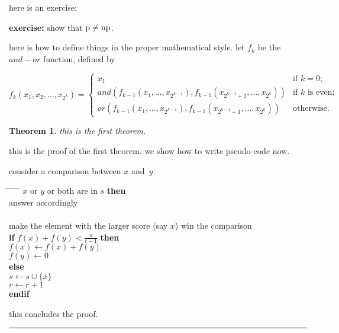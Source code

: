 \documentclass[twoside]{article}
\newcounter{lecnum}
\newtheorem{theorem}{Theorem}[lecnum]
\newenvironment{proof}{{\bf Proof:}}{\hfill\rule{2mm}{2mm}}
\begin{document}
 
here is an exercise:

{\bf exercise:}  show that ${\rm p}\ne{\rm np}$.

here is how to define things in the proper mathematical style.
let $f_k$ be the $and-or$ function, defined by

\[ f_k(x_1, x_2, \ldots, x_{2^k}) = \left\{ \begin{array}{ll}

	x_1 & \mbox{if $k = 0$;} \\

	and(f_{k-1}(x_1, \ldots, x_{2^{k-1}}),
	   f_{k-1}(x_{2^{k-1} + 1}, \ldots, x_{2^k}))
	 & \mbox{if $k$ is even;} \\

	or(f_{k-1}(x_1, \ldots, x_{2^{k-1}}),
	   f_{k-1}(x_{2^{k-1} + 1}, \ldots, x_{2^k}))	
	& \mbox{otherwise.} 
	\end{array}
	\right. \]

\begin{theorem}
this is the first theorem.
\end{theorem}

\begin{proof}
this is the proof of the first theorem. we show how to write pseudo-code now.

consider a comparison between $x$ and~$y$:
\begin{tabbing}
\hspace*{.25in} \= \hspace*{.25in} \= \hspace*{.25in} \= \hspace*{.25in} \= \hspace*{.25in} \=\kill
{} $x$ or $y$ or both are in $s$ {\bf then } \\
\>\> answer accordingly \\
 \\
\>\>    make the element with the larger score (say $x$) win the comparison \\
\>\> {\bf if} $f(x) + f(y) < \frac{n}{t-1}$ {\bf then} \\%
\>\>\> $f(x) \leftarrow f(x) + f(y)$ \\
\>\>\> $f(y) \leftarrow 0$ \\
\>\> {\bf else}  \\
\>\>\> $s \leftarrow s \cup \{ x \} $ \\
\>\>\> $r \leftarrow r+1$ \\
\>\> {\bf endif} \\
\end{tabbing}

this concludes the proof.
\end{proof}
\end{document}

